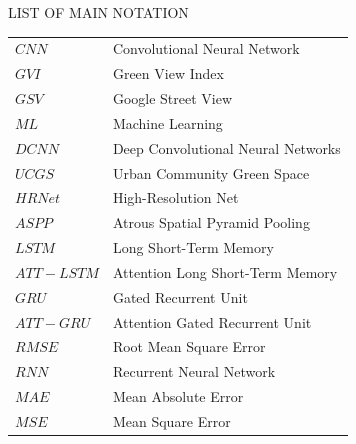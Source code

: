 \clearpage
\newpage
\begin{center}
  {\Large LIST OF MAIN NOTATION}\\[60pt]
\end{center}
\noindent
\begin{longtable}[l]{p{80pt}p{300pt}}

$CNN$ 	  &	 Convolutional Neural Network \\
$GVI$      & Green View Index \\
$GSV$ 	 	& Google Street View \\
$ML$ 	  &	 	Machine Learning \\
$DCNN$   &   Deep Convolutional Neural Networks\\
$UCGS$   &   Urban Community Green Space\\
$HRNet$   & High-Resolution Net\\
$ASPP$   &  Atrous Spatial Pyramid Pooling\\
$LSTM$   & Long Short-Term Memory   \\
$ATT-LSTM$      & Attention Long Short-Term Memory   \\
$GRU$   & Gated Recurrent Unit   \\
$ATT-GRU$   & Attention Gated Recurrent Unit   \\
$RMSE$   & Root Mean Square Error   \\
$RNN$   & Recurrent Neural Network   \\
$MAE$   & Mean Absolute Error   \\
$MSE$   & Mean Square Error     \\



\end{longtable}

